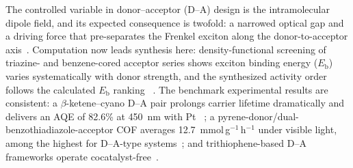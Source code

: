 The controlled variable in donor--acceptor (D--A) design is the intramolecular
dipole field, and its expected consequence is twofold: a narrowed optical gap
and a driving force that pre-separates the Frenkel exciton along the
donor-to-acceptor axis~\cite{liu2024dual,liu2025donor,shen2023efficient}.
Computation now leads synthesis here: density-functional screening of
triazine- and benzene-cored acceptor series shows exciton binding energy
($E_\mathrm{b}$) varies systematically with donor strength, and the
synthesized activity order follows the calculated $E_\mathrm{b}$ ranking
~\cite{qian2023computation}. The benchmark experimental results are
consistent: a $\beta$-ketene--cyano D--A pair prolongs carrier lifetime
dramatically and delivers an AQE of 82.6\% at 450~nm with Pt
~\cite{li2022covalent}; a pyrene-donor/dual-benzothiadiazole-acceptor COF
averages 12.7~mmol\,g$^{-1}$\,h$^{-1}$ under visible light, among the
highest for D--A-type systems~\cite{liu2024dual}; and trithiophene-based
D--A frameworks operate cocatalyst-free~\cite{naqvi2026design}.

